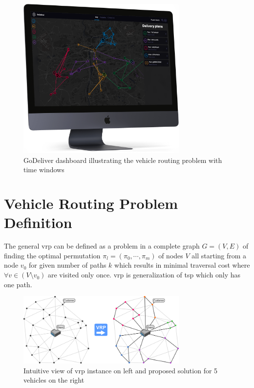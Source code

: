     \begin{figure}[ht]
        \centering
        \includegraphics[width=0.75\textwidth]{resources/intro/godeliver-dashboard.png}
        \caption{GoDeliver dashboard illustrating the vehicle routing problem with time windows}
        \label{fig:godeliver_dashboard}
    \end{figure}

\section{Vehicle Routing Problem Definition}
    
    The general \gls{vrp} can be defined as a problem in a complete graph $G=(V,E)$ of finding the optimal permutation $\pi_l = (\pi_0, \cdots, \pi_m)$ of nodes $V$ all starting from a node $v_0$ for given number of paths $k$ which results in minimal traversal cost where $\forall v \in (V \setminus v_0)$ are visited only once. \gls{vrp} is generalization of \gls{tsp} which only has one path.
    
    \begin{figure}[ht]
        \centering
        \includegraphics[width=0.75\textwidth]{resources/intro/vrp-graph.png}
        \caption{Intuitive view of \gls{vrp} instance on left and proposed solution for 5 vehicles on the right \cite{vrp-malaga}}
        \label{fig:vrp-graph}
    \end{figure}
    
